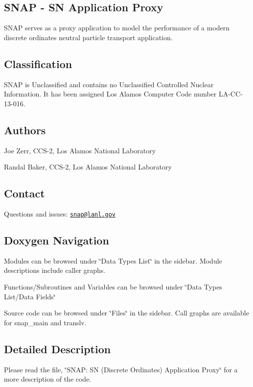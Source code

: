 \subsection*{S\-N\-A\-P -\/ S\-N Application Proxy}

S\-N\-A\-P serves as a proxy application to model the performance of a modern discrete ordinates neutral particle transport application.

\subsection*{Classification}

S\-N\-A\-P is Unclassified and contains no Unclassified Controlled Nuclear Information. It has been assigned Los Alamos Computer Code number L\-A-\/\-C\-C-\/13-\/016.

\subsection*{Authors}


\begin{DoxyEnumerate}
\item Joe Zerr, C\-C\-S-\/2, Los Alamos National Laboratory
\item Randal Baker, C\-C\-S-\/2, Los Alamos National Laboratory
\end{DoxyEnumerate}

\subsection*{Contact}

Questions and issues\-: \href{mailto:snap@lanl.gov}{\tt snap@lanl.\-gov}

\subsection*{Doxygen Navigation}

Modules can be browsed under \char`\"{}\-Data Types List\char`\"{} in the sidebar. Module descriptions include caller graphs.

Functions/\-Subroutines and Variables can be browsed under \char`\"{}\-Data Types List/\-Data Fields\char`\"{}

Source code can be browsed under \char`\"{}\-Files\char`\"{} in the sidebar. Call graphs are available for snap\-\_\-main and translv.

\subsection*{Detailed Description}

Please read the file, \char`\"{}\-S\-N\-A\-P\-: S\-N (\-Discrete Ordinates) Application Proxy\char`\"{} for a more description of the code. 